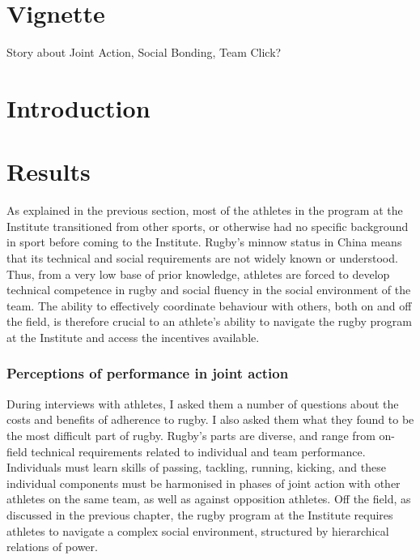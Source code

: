                                       \begin{CJK}{UTF8}{gbsn}


\section{Vignette}

Story about Joint Action, Social Bonding, Team Click?



\section{Introduction}








\section{Results}
As explained in the previous section, most of the athletes in the program at the Institute transitioned from other sports, or otherwise had no specific background in sport before coming to the Institute.  Rugby's minnow status in China means that its technical and social requirements are not widely known or understood.  Thus, from a very low base of prior knowledge, athletes are forced to develop technical competence in rugby and social fluency in the social environment of the team.  The ability to effectively coordinate behaviour with others, both on and off the field, is therefore crucial to an athlete's ability to navigate the rugby program at the Institute and access the incentives available.


\subsubsection{Perceptions of performance in joint action}

During interviews with athletes, I asked them a number of questions about the costs and benefits of adherence to rugby.  I also asked them what they found to be the most difficult part of rugby.  Rugby's parts are diverse, and range from on-field technical requirements related to individual and team performance.  Individuals must learn skills of passing, tackling, running, kicking, and these individual components must be harmonised in phases of joint action with other athletes on the same team, as well as against opposition athletes.  Off the field, as discussed in the previous chapter, the rugby program at the Institute requires athletes to navigate a complex social environment, structured by hierarchical relations of power.


\end{CJK}
